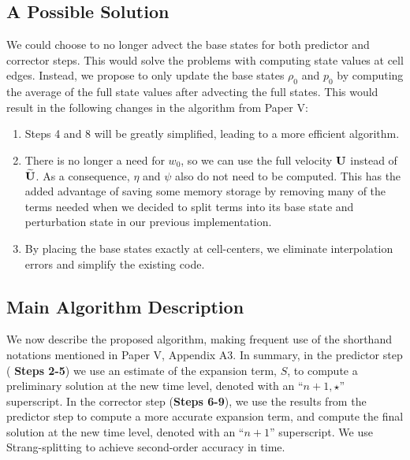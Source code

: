 \documentclass{aastex62}
\newcommand{\Ub}{{\bf{U}}}
\newcommand{\Ubt}{\widetilde{\Ub}}
\begin{document}
\subsection{A Possible Solution}
We could choose to no longer advect the base states for both predictor and corrector steps. This would solve the problems with computing state values at cell edges. Instead, we propose to only update the base states $\rho_0$ and $p_0$ by computing the average of the full state values after advecting the full states. This would result in the following changes in the algorithm from Paper V:
%
\begin{enumerate}
\item Steps 4 and 8 will be greatly simplified, leading to a more efficient algorithm.
\item There is no longer a need for $w_0$, so we can use the full velocity $\Ub$ instead of $\Ubt$. As a consequence, $\eta$ and $\psi$ also do not need to be computed. This has the added advantage of saving some memory storage by removing many of the terms needed when we decided to split terms into its base state and perturbation state in our previous implementation.
\item By placing the base states exactly at cell-centers, we eliminate interpolation errors and simplify the existing code.
\end{enumerate}
%

\subsection{Main Algorithm Description}\label{Sec:Main Algorithm Description}
We now describe the proposed algorithm, making frequent use of the
shorthand notations mentioned in Paper V, Appendix A3.  In summary, in the predictor step ({\bf
  Steps 2-5}) we use an estimate of the expansion term, $S$, to
compute a preliminary solution at the new time level, denoted with an
``$n+1,\star$'' superscript.  In the corrector step ({\bf Steps 6-9}),
we use the results from the predictor step to compute a more accurate
expansion term, and compute the final solution at the new time level,
denoted with an ``$n+1$'' superscript.  We use Strang-splitting to
achieve second-order accuracy in time.
\end{document}
